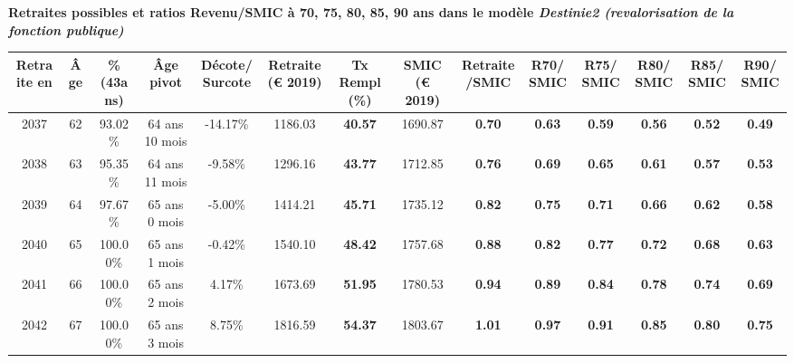 \vspace{0.1cm} 
{\bf \noindent Retraites possibles et ratios Revenu/SMIC à 70, 75, 80, 85, 90 ans dans le modèle \emph{Destinie2 (revalorisation de la fonction publique)}}  
 
\begin{adjustbox}{max width=\textwidth} 
\begin{tabular}[htb]{|c|c||c|c|c||c|c||c|c||c|c|c|c|c|} 
\hline 
 Retraite en &  Âge &  \%(43ans) &  Âge pivot &  Décote/Surcote &  Retraite (\euro{} 2019) &  Tx Rempl(\%) &  SMIC (\euro{} 2019) &  Retraite/SMIC &  R70/SMIC &  R75/SMIC &  R80/SMIC &  R85/SMIC &  R90/SMIC \\ 
\hline \hline 
 2037 &  62 &  93.02\% &  64 ans 10 mois &  -14.17\% &  1186.03 &  {\bf 40.57} &  1690.87 &  {\bf {\color{red} 0.70}} &  {\bf {\color{red} 0.63}} &  {\bf {\color{red} 0.59}} &  {\bf {\color{red} 0.56}} &  {\bf {\color{red} 0.52}} &  {\bf {\color{red} 0.49}} \\ 
\hline 
 2038 &  63 &  95.35\% &  64 ans 11 mois &  -9.58\% &  1296.16 &  {\bf 43.77} &  1712.85 &  {\bf {\color{red} 0.76}} &  {\bf {\color{red} 0.69}} &  {\bf {\color{red} 0.65}} &  {\bf {\color{red} 0.61}} &  {\bf {\color{red} 0.57}} &  {\bf {\color{red} 0.53}} \\ 
\hline 
 2039 &  64 &  97.67\% &  65 ans 0 mois &  -5.00\% &  1414.21 &  {\bf 45.71} &  1735.12 &  {\bf {\color{red} 0.82}} &  {\bf {\color{red} 0.75}} &  {\bf {\color{red} 0.71}} &  {\bf {\color{red} 0.66}} &  {\bf {\color{red} 0.62}} &  {\bf {\color{red} 0.58}} \\ 
\hline 
 2040 &  65 &  100.00\% &  65 ans 1 mois &  -0.42\% &  1540.10 &  {\bf 48.42} &  1757.68 &  {\bf {\color{red} 0.88}} &  {\bf {\color{red} 0.82}} &  {\bf {\color{red} 0.77}} &  {\bf {\color{red} 0.72}} &  {\bf {\color{red} 0.68}} &  {\bf {\color{red} 0.63}} \\ 
\hline 
 2041 &  66 &  100.00\% &  65 ans 2 mois &  4.17\% &  1673.69 &  {\bf 51.95} &  1780.53 &  {\bf {\color{red} 0.94}} &  {\bf {\color{red} 0.89}} &  {\bf {\color{red} 0.84}} &  {\bf {\color{red} 0.78}} &  {\bf {\color{red} 0.74}} &  {\bf {\color{red} 0.69}} \\ 
\hline 
 2042 &  67 &  100.00\% &  65 ans 3 mois &  8.75\% &  1816.59 &  {\bf 54.37} &  1803.67 &  {\bf 1.01} &  {\bf {\color{red} 0.97}} &  {\bf {\color{red} 0.91}} &  {\bf {\color{red} 0.85}} &  {\bf {\color{red} 0.80}} &  {\bf {\color{red} 0.75}} \\ 
\hline 
\hline 
\end{tabular} 
\end{adjustbox} 
 
